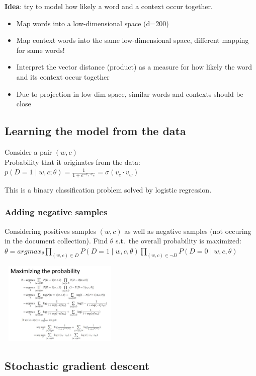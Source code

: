 \textbf{Idea}: try to model how likely a word and a context occur
together.
\begin{itemize}
\item Map words into a low-dimensional space (d=200)
\item Map context words into the same low-dimensional space, different
  mapping for same words!
\item Interpret the vector distance (product) as a measure for how
  likely the word and its context occur together
\item Due to projection in low-dim space, similar words and contexts
  should be close
\end{itemize}

\subsection{Learning the model from the data}
Consider a pair $ (w, c) $ \\
Probability that it originates from the data: \\
$ p(D = 1 \mid w,c;\theta) = \frac{1}{1 + e^{-v_c \cdot v_w }} =
\sigma(v_c \cdot v_w) $

This is a binary classification problem solved by logistic
regression.

\subsubsection{Adding negative samples}

Considering positives samples $ (w, c) $ as well as negative samples
(not occuring in the document collection). Find $ \theta $ s.t.\ the
overall probability is maximized:
$ \theta = argmax_\theta \prod_{(w,c) \in D} P(D = 1 \mid w,c,\theta)
\prod_{(w,c) \in \neg{D}} P(D = 0 \mid w,c,\theta) $

\includegraphics[width=220px,height=150px]{negsample}

\subsection{Stochastic gradient descent}

